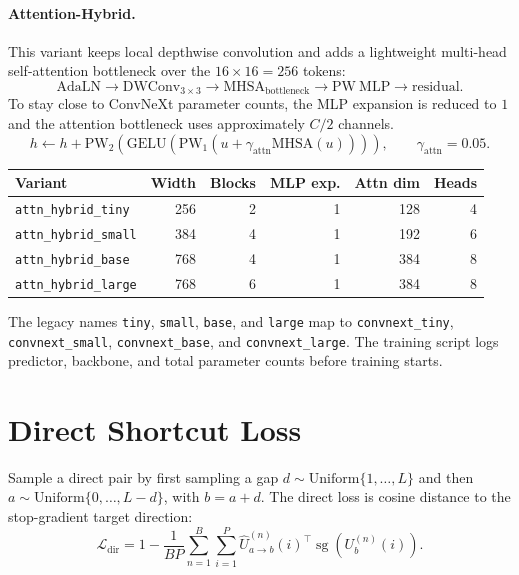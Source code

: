 \documentclass[11pt]{article}
\begin{document}
\paragraph{Attention-Hybrid.}
This variant keeps local depthwise convolution and adds a lightweight
multi-head self-attention bottleneck over the $16\times16=256$ tokens:
\[
    \mathrm{AdaLN}\rightarrow
    \mathrm{DWConv}_{3\times3}\rightarrow
    \mathrm{MHSA}_{\mathrm{bottleneck}}\rightarrow
    \mathrm{PW\ MLP}\rightarrow\mathrm{residual}.
\]
To stay close to ConvNeXt parameter counts, the MLP expansion is reduced to
$1$ and the attention bottleneck uses approximately $C/2$ channels.
\[
    h\leftarrow h+
    \mathrm{PW}_2\!\left(
    \mathrm{GELU}\!\left(
    \mathrm{PW}_1\!\left(u+\gamma_{\mathrm{attn}}\mathrm{MHSA}(u)\right)
    \right)\right),
    \qquad \gamma_{\mathrm{attn}}=0.05 .
\]

\begin{center}
\begin{tabular}{lrrrrr}
\toprule
Variant & Width & Blocks & MLP exp. & Attn dim & Heads \\
\midrule
\texttt{attn\_hybrid\_tiny}  & 256 & 2 & 1 & 128 & 4 \\
\texttt{attn\_hybrid\_small} & 384 & 4 & 1 & 192 & 6 \\
\texttt{attn\_hybrid\_base}  & 768 & 4 & 1 & 384 & 8 \\
\texttt{attn\_hybrid\_large} & 768 & 6 & 1 & 384 & 8 \\
\bottomrule
\end{tabular}
\end{center}

The legacy names \texttt{tiny}, \texttt{small}, \texttt{base}, and
\texttt{large} map to \texttt{convnext\_tiny}, \texttt{convnext\_small},
\texttt{convnext\_base}, and \texttt{convnext\_large}. The training script
logs predictor, backbone, and total parameter counts before training starts.

\section{Direct Shortcut Loss}
Sample a direct pair by first sampling a gap $d\sim\mathrm{Uniform}\{1,\ldots,L\}$
and then $a\sim\mathrm{Uniform}\{0,\ldots,L-d\}$, with $b=a+d$.
The direct loss is cosine distance to the stop-gradient target direction:
\[
    \mathcal{L}_{\mathrm{dir}}
    =
    1-
    \frac{1}{BP}\sum_{n=1}^{B}\sum_{i=1}^{P}
    \hat U_{a\rightarrow b}^{(n)}(i)^\top
    \operatorname{sg}(U_b^{(n)}(i)).
\]
\end{document}
